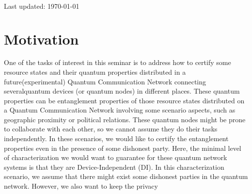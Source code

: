 \documentclass[12pt]{article}
\begin{document}
\begin{titlepage}
\begin{minipage}{0.75\textwidth}
    \end{minipage}\\[2cm]
    \vspace{-1cm}    
    
    
    {\large{Last updated: \today}}\\[2cm] %
    
    \vfill %

    \end{titlepage}

    \clearpage

    
    \section{Motivation}
    \label{sec:motivation}

    One of the tasks of interest in this seminar is to address how to certify some resource states and their quantum properties distributed in a future\break (experimental) Quantum Communication Network connecting several\break quantum devices (or quantum nodes) in different places. These quantum properties can be entanglement properties of those resource states distributed on a Quantum Communication Network involving some scenario aspects, such as geographic proximity or political relations. These quantum nodes might be prone to collaborate with each other, so we cannot assume they do their tasks independently. In these scenarios, we would like to certify the entanglement properties even in the presence of some dishonest party. Here, the minimal level of characterization we would want to guarantee for these quantum network systems is that they are Device-Independent (DI). In this characterization scenario, we assume that there might exist some dishonest parties in the quantum network. However, we also want to keep the privacy
    
\end{document}
